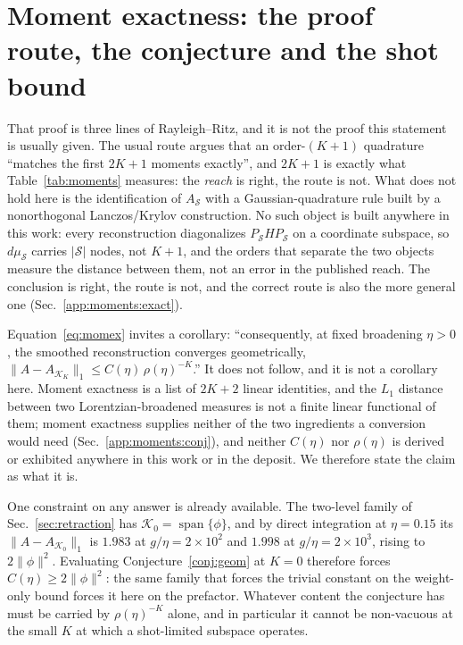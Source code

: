 \section{Moment exactness: the proof route, the conjecture and the shot bound}
\label{sm:moments}

That proof is three lines of Rayleigh--Ritz, and it is not the proof this statement is usually given.
The usual route argues that an order-$(K{+}1)$ quadrature ``matches the first $2K+1$ moments
exactly'', and $2K+1$ is exactly what Table~\ref{tab:moments} measures: the \emph{reach} is right,
the route is not. What does not hold here
is the identification of $A_{\mathcal S}$ with a Gaussian-quadrature rule built by a nonorthogonal
Lanczos/Krylov construction. No such object is built anywhere in this work: every reconstruction
diagonalizes $P_{\mathcal S}HP_{\mathcal S}$ on a coordinate subspace, so $d\mu_{\mathcal S}$ carries
$|\mathcal S|$ nodes, not $K+1$, and the orders that separate the two objects measure the distance between them,
not an error in the published reach. The conclusion is right, the route is not, and the correct route
is also the more general one (Sec.~\ref{app:moments:exact}).

Equation~\eqref{eq:momex} invites a corollary: ``consequently, at fixed broadening
$\eta>0$, the smoothed reconstruction converges geometrically,
$\lVert A-A_{\mathcal K_K}\rVert_{1}\le C(\eta)\,\rho(\eta)^{-K}$.'' It does not follow, and it is
not a corollary here. Moment exactness is a list of $2K+2$ linear identities, and the $L_1$
distance between two Lorentzian-broadened measures is not a finite linear functional of them;
moment exactness supplies neither of the two ingredients a conversion would need
(Sec.~\ref{app:moments:conj}), and neither $C(\eta)$ nor
$\rho(\eta)$ is derived or exhibited anywhere in this work or in the deposit. We therefore state the
claim as what it is.

One constraint on any answer is already available. The two-level family of Sec.~\ref{sec:retraction}
has $\mathcal K_0=\operatorname{span}\{\phi\}$, and by direct integration at $\eta=0.15$ its
$\lVert A-A_{\mathcal K_0}\rVert_{1}$ is $1.983$ at $g/\eta=2\times10^{2}$ and $1.998$ at
$g/\eta=2\times10^{3}$, rising to $2\lVert\phi\rVert^{2}$. Evaluating Conjecture~\ref{conj:geom} at
$K=0$ therefore forces $C(\eta)\ge2\lVert\phi\rVert^{2}$: the same family that forces the trivial
constant on the weight-only bound forces it here on the prefactor. Whatever content the conjecture has
must be carried by $\rho(\eta)^{-K}$ alone, and in particular it cannot be non-vacuous at the small $K$
at which a shot-limited subspace operates.

